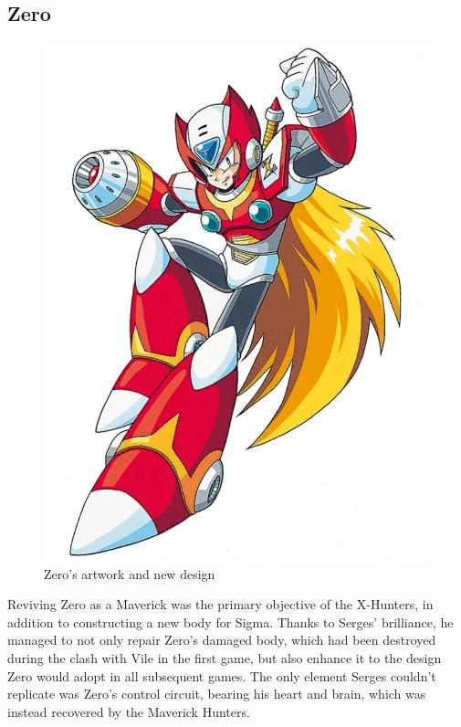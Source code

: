 \subsection{Zero}\label{boss:Zero_X2}
\begin{figure}[htp]
	\centering
	\includegraphics[height=\portraitsize]{figures/X2/Hunter_stages/Zero.png}
	\caption{Zero's artwork and new design~\cite{book:MMX_Complete_art}}
\end{figure}
Reviving Zero as a Maverick was the primary objective of the X-Hunters, in addition to constructing a new body for Sigma. Thanks to Serges' brilliance, he managed to not only repair Zero's damaged body, which had been destroyed during the clash with Vile in the first game, but also enhance it to the design Zero would adopt in all subsequent games. The only element Serges couldn't replicate was Zero's control circuit, bearing his heart and brain, which was instead recovered by the Maverick Hunters.

